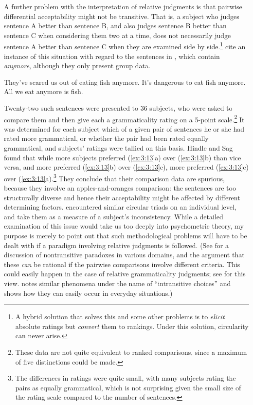 A further problem with the interpretation of relative judgments is that pairwise differential acceptability might not be transitive. That is, a subject who judges sentence A better than sentence B, and also judges sentence B better than sentence C when considering them two at a time, does not necessarily judge sentence A better than sentence C when they are examined side by side.\footnote{A hybrid solution that solves this and some other problems is to \textit{elicit} absolute ratings but
\textit{convert} them to rankings. Under this solution, circularity can never arise.}
\citet{HindleEtAl1975} cite an instance of this situation with regard to the sentences in , which contain \textit{anymore}, although they only present group data.

\ea \label{ex:3:13}
\ea They've scared us out of eating fish anymore. 
\ex It's dangerous to eat fish anymore.
\ex All we eat anymore is fish.
\z
\z

\noindent
Twenty-two such sentences were presented to 36 subjects, who were asked to compare them and then give each a grammaticality rating on a 5-point scale.\footnote{These data are not quite equivalent to ranked comparisons, since a maximum of five distinctions could be made.}
 It was determined for each subject which of a given pair of sentences he or she had rated more grammatical, or whether the pair had been rated equally grammatical, and subjects' ratings were tallied on this basis. Hindle and Sag found that while more subjects preferred (\ref{ex:3:13}a) over (\ref{ex:3:13}b) than vice versa, and more preferred
(\ref{ex:3:13}b) over (\ref{ex:3:13}c), more preferred (\ref{ex:3:13}c) over (\ref{ex:3:13}a).\footnote{The differences in ratings were quite small, with many subjects rating the pairs as equally grammatical, which is not surprising given the small size of the rating scale compared to the number of sentences.}
 They conclude that their comparison data are spurious, because they involve an apples-and-oranges comparison: the sentences are too structurally diverse and hence their acceptability might be affected by different determining factors. \citet{DanksEtAl1970} encountered similar circular triads on an individual level, and take them as a measure of a subject's inconsistency. While a detailed examination of this issue would take us too deeply into psychometric theory, my purpose is merely to point out that such methodological problems will have to be dealt with if a paradigm involving relative judgments is followed. (See \citet{Gardner1974} for a discussion of nontransitive paradoxes in various domains, and the argument that these \textit{can} be rational if the pairwise comparisons involve different criteria. This could easily happen in the case of relative grammaticality judgments; see \citet{Watt1975} for this view. \citet{Einhorn1982} notes similar phenomena under the name of ``intransitive choices'' and shows how they can easily occur in everyday situations.)

